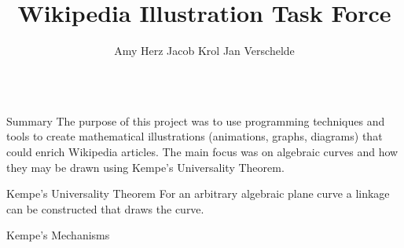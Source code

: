\documentclass{beamer}
\title{Wikipedia Illustration Task Force}
\author{Amy Herz \quad Jacob Krol \quad Jan Verschelde}
\institute{University of Illinois at Chicago}
\begin{document}
\begin{frame}{}
\begin{columns}[t]
\begin{column}{0.245\linewidth}

\begin{block}{Summary}
The purpose of this project was to use programming techniques and tools to create mathematical illustrations (animations, graphs, diagrams) that could enrich Wikipedia articles. The main focus was on algebraic curves and how they may be drawn using Kempe's Universality Theorem.
\end{block}

\begin{block}{Kempe's Universality Theorem}
For an arbitrary algebraic plane curve a linkage can be constructed that draws the curve.
\end{block}



\begin{block}{Kempe's Mechanisms}


\end{block}
\end{column}
\end{columns}
\end{frame}
\end{document}

